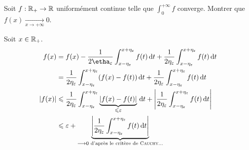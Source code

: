 \begin{exercice}
    Soit $f : \mathbb{R}_+ \to \mathbb{R}$ uniformément continue telle que $\int_0^{+\infty} f$ converge. Montrer que $f(x) \xrightarrow[x \to + \infty]{} 0$.
\end{exercice}

\begin{solution}
    Soit $x \in \mathbb{R}_+$.
    \begin{align*}
        f(x) &= f(x) - \frac{1}{2\etha_{\varepsilon}} \int_{x-\eta_{\varepsilon}}^{x+\eta_{\varepsilon}} f(t) \d t + \frac{1}{2\eta_{\varepsilon}} \int_{x-\eta_{\varepsilon}}^{x+\eta_{\varepsilon}} f(t) \d t \\
        &= \frac{1}{2\eta_{\varepsilon}} \int_{x-\eta_{\varepsilon}}^{x+\eta_{\varepsilon}} (f(x) - f(t)) \d t + \frac{1}{2\eta_{\varepsilon}} \int_{x-\eta_{\varepsilon}}^{x+\eta_{\varepsilon}} f(t) \d t \\
        |f(x)| &\leqslant \frac{1}{2\eta_{\varepsilon}} \int_{x-\eta_{\varepsilon}}^{x+\eta_{\varepsilon}} \underbrace{|f(x) - f(t)|}_{\leqslant \varepsilon} \d t + \left| \frac{1}{2\eta_{\varepsilon}} \int_{x-\eta_{\varepsilon}}^{x+\eta_{\varepsilon}} f(t) \d t \right| \\
        &\leqslant \varepsilon + \underbrace{\left|\frac{1}{2\eta_{\varepsilon}} \int_{x-\eta_{\varepsilon}}^{x+\eta_{\varepsilon}} f(t) \d t \right|}_{\longrightarrow 0 \text{ d'après le critère de \textsc{Cauchy}...}}
    \end{align*}
\end{solution}

